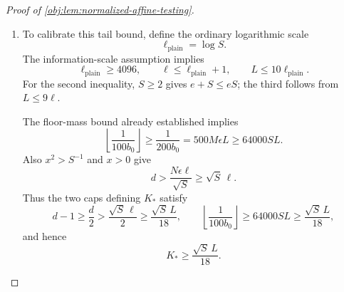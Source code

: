 \documentclass[11pt]{article}
\begin{document}
\begin{proof}[Proof of \cref{obj:lem:normalized-affine-testing}]
\begin{enumerate}
The normalization identity is
\[
\tau_\iota-t_\iota^{\mathrm{tar}}
=(Z_\iota^{\mathrm{tar}}-t_\iota^{\mathrm{tar}})
+\tau_\iota(1-Q).
\]
Since \(0\le\tau_\iota\le1\), squaring and integrating yields
\[
\begin{aligned}
\mathbb E_{\nu_{\mathrm{lat}}}
(\tau_\iota-t_\iota^{\mathrm{tar}})^2
&\le2\operatorname{Var}(Z_\iota^{\mathrm{tar}})
   +2\operatorname{Var}(Q)\\
&\le4K_*b_0^2+8K_*B\alpha.
\end{aligned}
\]
Markov's inequality at the positive radius \(\Delta_{\mathrm{tar}}/8\), together with
\(\Delta_{\mathrm{tar}}\ge K_*b_0/12\), gives
\[
\begin{aligned}
\nu_{\mathrm{lat}}\left\{
|\tau_\iota-t_\iota^{\mathrm{tar}}|
\ge\frac{\Delta_{\mathrm{tar}}}{8}\right\}
&\le
\frac{64(4K_*b_0^2+8K_*B\alpha)}
     {\Delta_{\mathrm{tar}}^2}\\
&\le\frac{36864+7372800\epsilon^2L^2}{K_*}\\
&\le\frac{2^{23}(1+\epsilon^2L^2)}{K_*}.
\end{aligned}
\]
The middle estimate uses the tuning identity
\[
B\alpha=100\epsilon^2L^2b_0^2.
\]

\item
To calibrate this tail bound, define the ordinary logarithmic scale
\[
\ell_{\mathrm{plain}}=\log S.
\]
The information-scale assumption implies
\[
\ell_{\mathrm{plain}}\ge4096,\qquad
\ell\le\ell_{\mathrm{plain}}+1,\qquad
L\le10\ell_{\mathrm{plain}}.
\]
For the second inequality, \(S\ge2\) gives \(e+S\le eS\); the third follows from \(L\le9\ell\).

The floor-mass bound already established implies
\[
\left\lfloor\frac1{100b_0}\right\rfloor
\ge\frac1{200b_0}=500M\epsilon L
\ge64000SL.
\]
Also \(x^2>S^{-1}\) and \(x>0\) give
\[
d>\frac{N\epsilon\ell}{\sqrt S}\ge\sqrt S\,\ell.
\]
Thus the two caps defining \(K_*\) satisfy
\[
d-1\ge\frac d2>\frac{\sqrt S\,\ell}{2}
\ge\frac{\sqrt S\,L}{18},
\qquad
\left\lfloor\frac1{100b_0}\right\rfloor
\ge64000SL\ge\frac{\sqrt S\,L}{18},
\]
and hence
\[
K_*\ge\frac{\sqrt S\,L}{18}.
\]


\end{enumerate}
\end{proof}
\end{document}
